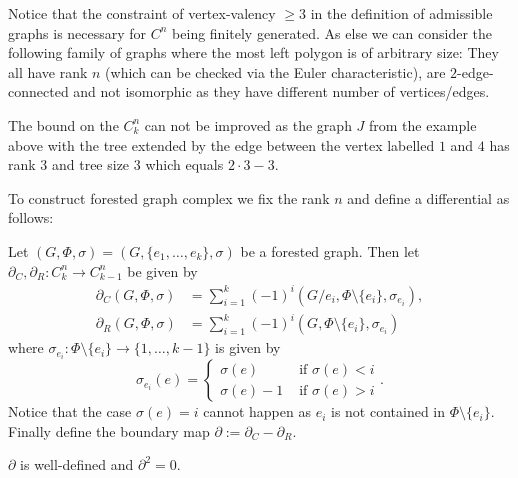 \begin{remark}
	Notice that the constraint of vertex-valency $\geq 3$ in the definition of admissible graphs is necessary for $C^{n}$ being finitely generated.
	As else we can consider the following family of graphs where the most left polygon is of arbitrary size:
	They all have rank $n$ (which can be checked via the Euler characteristic), are $2$-edge-connected and not isomorphic as they have different number of vertices/edges.
\end{remark}

\begin{remark}
	The bound on the $C_{k}^{n}$ can not be improved as the graph $J$ from the example above with the tree extended by the edge between the vertex labelled $1$ and $4$ has rank $3$ and
	tree size $3$ which equals $2 \cdot 3 -3$.
\end{remark}

To construct forested graph complex we fix the rank $n$ and define a differential as follows:
\begin{definition}
	Let $(G,\Phi,\sigma) = (G, \{e_1,\ldots,e_{k}\},\sigma)$ be a forested graph. Then let $\partial_{C}, \partial_{R}: C_{k}^{n} \to C_{k-1}^{n}$ be given by
	\begin{align*}
		\partial_{C}(G,\Phi,\sigma) &= \sum_{i = 1}^{k} (-1)^{i} (G / e_{i}, \Phi \setminus \{e_{i}\}, \sigma_{e_{i}}),\\
		\partial _{R}(G,\Phi,\sigma) &= \sum_{i = 1}^{k} (-1)^{i} (G,\Phi \setminus \{e_{i}\}, \sigma_{e_{i}}) 
	\end{align*}
	where $\sigma_{e_{i}}: \Phi \setminus \{e_{i}\} \to \{1,\ldots,k-1\}$ is given by
	\[
		\sigma_{e_{i}}(e) = \begin{cases}
			\sigma(e) & \text{ if }\sigma(e) < i\\
			\sigma(e) - 1 & \text{ if } \sigma(e) > i
		\end{cases}
	.\]
	Notice that the case $\sigma(e) = i$ cannot happen as $e_{i}$ is not contained in $\Phi \setminus \{e_{i}\}$. 
	Finally define the boundary map $\partial := \partial_{C} - \partial_{R}$.
\end{definition}

\begin{proposition}
	$\partial$ is well-defined and $\partial^2 = 0$.
\end{proposition}

